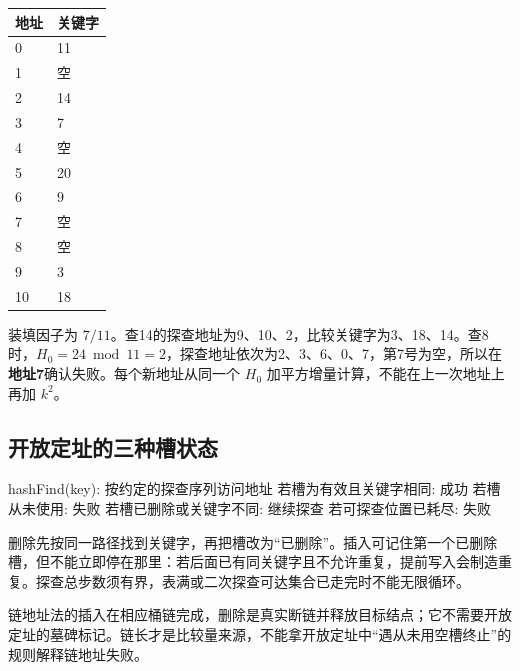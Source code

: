 \begin{wideblock}

\par\medskip\noindent\begin{minipage}{\linewidth}\fontsize{9.3}{12}\selectfont\begin{tabularx}{\linewidth}{@{}YY@{}}
\toprule\noalign{}
地址 & 关键字 \\
\midrule\noalign{}


0 & 11 \\
1 & 空 \\
2 & 14 \\
3 & 7 \\
4 & 空 \\
5 & 20 \\
6 & 9 \\
7 & 空 \\
8 & 空 \\
9 & 3 \\
10 & 18 \\
\bottomrule\end{tabularx}
\end{minipage}\par\medskip

\end{wideblock}

装填因子为 \(7/11\)。查14的探查地址为9、10、2，比较关键字为3、18、14。查8时，\(H_0=24\bmod11=2\)，探查地址依次为2、3、6、0、7，第7号为空，所以在\textbf{地址7}确认失败。每个新地址从同一个 \(H_0\) 加平方增量计算，不能在上一次地址上再加 \(k^2\)。

\subsection{开放定址的三种槽状态}\label{DS07-hash-code}

\begin{codeblock}[language={}]
hashFind(key):
    按约定的探查序列访问地址
    若槽为有效且关键字相同: 成功
    若槽从未使用: 失败
    若槽已删除或关键字不同: 继续探查
    若可探查位置已耗尽: 失败
\end{codeblock}

删除先按同一路径找到关键字，再把槽改为``已删除''。插入可记住第一个已删除槽，但不能立即停在那里：若后面已有同关键字且不允许重复，提前写入会制造重复。探查总步数须有界，表满或二次探查可达集合已走完时不能无限循环。

链地址法的插入在相应桶链完成，删除是真实断链并释放目标结点；它不需要开放定址的墓碑标记。链长才是比较量来源，不能拿开放定址中``遇从未用空槽终止''的规则解释链地址失败。

